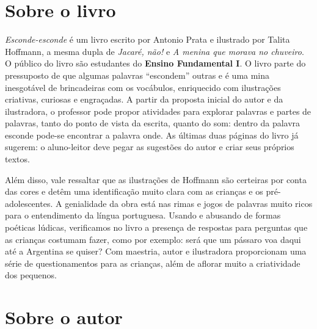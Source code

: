 \documentclass[11pt]{extarticle}
\begin{document}




\section{Sobre o livro}

\textit{Esconde-esconde} é um livro escrito por Antonio Prata e ilustrado por Talita Hoffmann, a mesma dupla de \textit{Jacaré, não!} e \textit{A menina que morava no chuveiro}. O público do livro são estudantes do \textbf{Ensino Fundamental I}. O livro parte do pressuposto de que algumas palavras “escondem” outras e é uma mina inesgotável de brincadeiras com os vocábulos, enriquecido com ilustrações criativas, curiosas e engraçadas. A partir da proposta inicial do autor e da ilustradora, o professor pode propor atividades para explorar palavras e partes de palavras, tanto do ponto de vista da escrita, quanto do som: dentro da palavra esconde pode-se encontrar a palavra onde. As últimas duas páginas do livro já sugerem: o aluno-leitor deve pegar as sugestões do autor e criar seus próprios textos.

Além disso, vale ressaltar que as ilustrações de Hoffmann são certeiras por conta das cores e detêm uma identificação muito clara com as crianças e os pré-adolescentes. A genialidade da obra está nas rimas e jogos de palavras muito ricos para o entendimento da língua portuguesa. Usando e abusando de formas poéticas lúdicas, verificamos no livro a presença de respostas para perguntas que as crianças costumam fazer, como por exemplo: será que um pássaro voa daqui até a Argentina se quiser? Com maestria, autor e ilustradora proporcionam uma série de questionamentos para as crianças, além de aflorar muito a criatividade dos pequenos.

\section{Sobre o autor}
\end{document}
